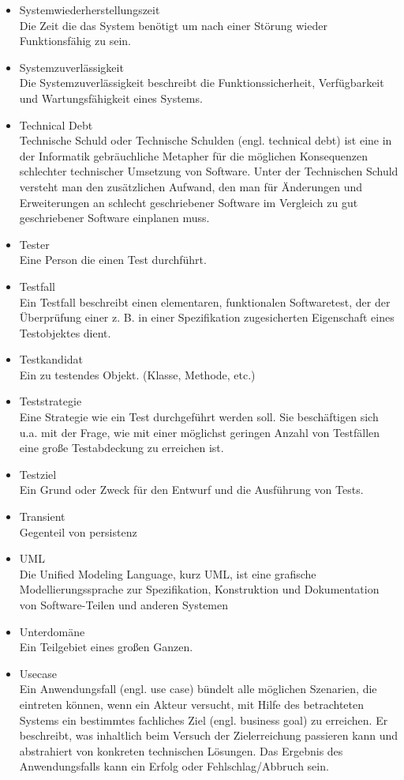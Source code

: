 \begin{itemize}
\item 	Systemwiederherstellungszeit \\  Die Zeit die das System benötigt um nach einer Störung wieder Funktionsfähig zu sein.
\item 	Systemzuverlässigkeit \\Die Systemzuverlässigkeit beschreibt die Funktionssicherheit, Verfügbarkeit und Wartungsfähigkeit eines Systems. 	
\item 	Technical Debt \\ Technische Schuld oder Technische Schulden (engl. technical debt) ist eine in der Informatik gebräuchliche Metapher für die möglichen Konsequenzen schlechter technischer Umsetzung von Software. Unter der Technischen Schuld versteht man den zusätzlichen Aufwand, den man für Änderungen und Erweiterungen an schlecht geschriebener Software im Vergleich zu gut geschriebener Software einplanen muss.
\item 	Tester \\ Eine Person die einen Test durchführt.
\item 	Testfall \\ Ein Testfall beschreibt einen elementaren, funktionalen Softwaretest, der der Überprüfung einer z. B. in einer Spezifikation zugesicherten Eigenschaft eines Testobjektes dient. 
\item 	Testkandidat \\ Ein zu testendes Objekt. (Klasse, Methode, etc.)
\item 	Teststrategie \\ Eine Strategie wie ein Test durchgeführt werden soll. Sie beschäftigen sich u.a. mit der Frage, wie mit einer möglichst geringen Anzahl von Testfällen eine große Testabdeckung zu erreichen ist.
\item 	Testziel \\ Ein Grund oder Zweck für den Entwurf und die Ausführung von Tests.
\item 	Transient \\ Gegenteil von persistenz
\item 	UML \\ Die Unified Modeling Language, kurz UML, ist eine grafische Modellierungssprache zur Spezifikation, Konstruktion und Dokumentation von Software-Teilen und anderen Systemen
\item 	Unterdomäne \\ Ein Teilgebiet eines großen Ganzen.
\item 	Usecase \\ Ein Anwendungsfall (engl. use case) bündelt alle möglichen Szenarien, die eintreten können, wenn ein Akteur versucht, mit Hilfe des betrachteten Systems ein bestimmtes fachliches Ziel (engl. business goal) zu erreichen. Er beschreibt, was inhaltlich beim Versuch der Zielerreichung passieren kann und abstrahiert von konkreten technischen Lösungen. Das Ergebnis des Anwendungsfalls kann ein Erfolg oder Fehlschlag/Abbruch sein.

\end{itemize}
